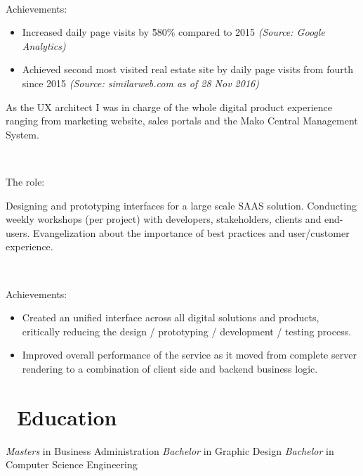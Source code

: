 \documentclass{resume}
\begin{document}
  ~\par
  {Achievements:}\par
  \begin{itemize}
    \item Increased daily page visits by \~580\% compared to 2015 \textit{(Source: Google Analytics)}
    \item Achieved second most visited real estate site by daily page visits from fourth since 2015 \textit{(Source: similarweb.com as of 28 Nov 2016)}
  \end{itemize}
  As the UX architect I was in charge of the whole digital product experience ranging from marketing website, sales portals and the Mako Central Management System.\par
  ~\par
  {The role:}\par
  Designing and prototyping interfaces for a large scale SAAS solution. Conducting weekly workshops (per project) with developers, stakeholders, clients and end-users. Evangelization about the importance of best practices and user/customer experience.\par
  ~\par
  {Achievements:}\par

\begin{itemize}
  \item Created an unified interface across all digital solutions and products, critically reducing the design / prototyping / development / testing process.
  \item Improved overall performance of the service as it moved from complete server rendering to a combination of client side and backend business logic.
\end{itemize}

\section{\faGraduationCap\ Education}
\textit{Masters} in Business Administration
\textit{Bachelor} in Graphic Design
\textit{Bachelor} in Computer Science Engineering
\end{document}
